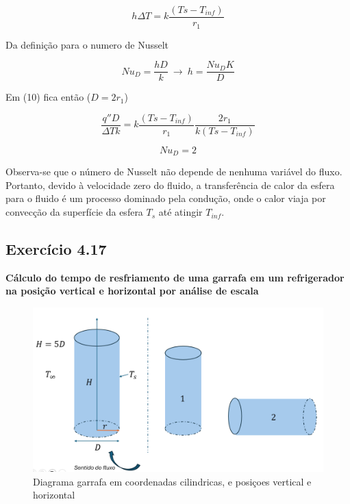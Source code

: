 \documentclass[12pt]{article}
\begin{document}
\begin{equation}
	h\Delta T = k \frac{(Ts - T_{inf} ) }{r_{1}}
\end{equation}

Da definição para o numero de Nusselt

\begin{equation}
	Nu_{D} = \frac{hD}{k} \ \rightarrow \  h = \frac{Nu_{D}K}{D}
\end{equation}

Em (10) fica então ($D = 2r_{1}$)

\begin{equation}
	\frac{q''D}{\Delta T k} = k \frac{(Ts - T_{inf} ) }{r_{1}}\frac{2r_{1}}{k (Ts - T_{inf} )}
\end{equation}

\begin{equation}
	Nu_{D} = 2
\end{equation}


Observa-se que o número de Nusselt não depende de nenhuma variável do fluxo. Portanto, devido à velocidade zero do fluido, a transferência de calor da esfera para o fluido é um processo dominado pela condução, onde o calor viaja por convecção da superfície da esfera $T_{s}$ até atingir $T_{inf}$.








\subsection*{Exercício 4.17}


\textbf{Cálculo do tempo de resfriamento de uma garrafa em um refrigerador na posição vertical e horizontal por análise de escala}\\

\begin{figure}[H]
	\centering
	\includegraphics[width=.65\textwidth]{Figures/1_2}
	\caption{Diagrama garrafa em coordenadas cilindricas, e posiçoes vertical e horizontal}
\end{figure}
\end{document}
